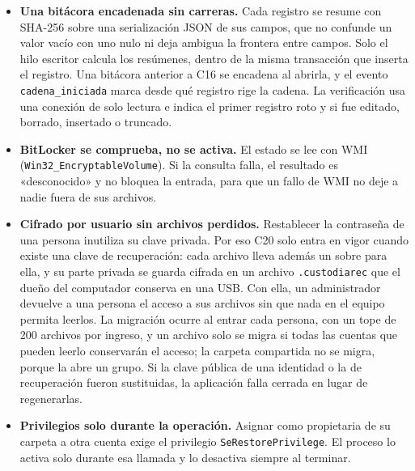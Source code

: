 \documentclass[conference]{IEEEtran}
\begin{document}
\begin{itemize}
    \item \textbf{Una bitácora encadenada sin carreras.} Cada registro se resume con SHA-256 sobre una serialización JSON de sus campos, que no confunde un valor vacío con uno nulo ni deja ambigua la frontera entre campos. Solo el hilo escritor calcula los resúmenes, dentro de la misma transacción que inserta el registro. Una bitácora anterior a C16 se encadena al abrirla, y el evento \texttt{cadena\_iniciada} marca desde qué registro rige la cadena. La verificación usa una conexión de solo lectura e indica el primer registro roto y si fue editado, borrado, insertado o truncado.
    \item \textbf{BitLocker se comprueba, no se activa.} El estado se lee con WMI (\texttt{Win32\_EncryptableVolume}). Si la consulta falla, el resultado es «desconocido» y no bloquea la entrada, para que un fallo de WMI no deje a nadie fuera de sus archivos.
    \item \textbf{Cifrado por usuario sin archivos perdidos.} Restablecer la contraseña de una persona inutiliza su clave privada. Por eso C20 solo entra en vigor cuando existe una clave de recuperación: cada archivo lleva además un sobre para ella, y su parte privada se guarda cifrada en un archivo \texttt{.custodiarec} que el dueño del computador conserva en una USB. Con ella, un administrador devuelve a una persona el acceso a sus archivos sin que nada en el equipo permita leerlos. La migración ocurre al entrar cada persona, con un tope de 200 archivos por ingreso, y un archivo solo se migra si todas las cuentas que pueden leerlo conservarán el acceso; la carpeta compartida no se migra, porque la abre un grupo. Si la clave pública de una identidad o la de recuperación fueron sustituidas, la aplicación falla cerrada en lugar de regenerarlas.
    \item \textbf{Privilegios solo durante la operación.} Asignar como propietaria de su carpeta a otra cuenta exige el privilegio \texttt{SeRestorePrivilege}. El proceso lo activa solo durante esa llamada y lo desactiva siempre al terminar.
\end{itemize}
\end{document}

